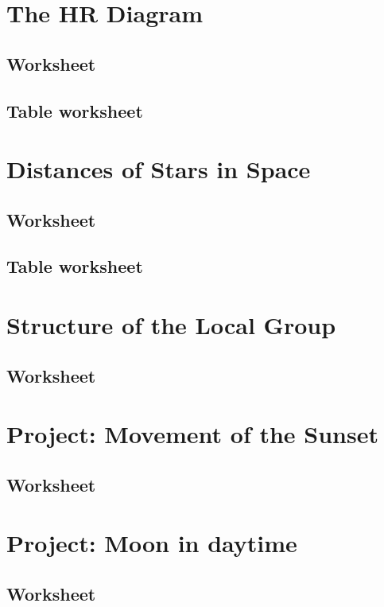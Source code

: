 \documentclass[12pt]{article}
\begin{document}
\newpage
\section{The HR Diagram}\label{apx:lab_09}
\subsection{Worksheet}\label{apx:lab_09_ws}


\newpage
\subsection{Table worksheet}\label{apx:lab_09_tb}
%

\newpage
\section{Distances of Stars in Space}\label{apx:lab_10}
\subsection{Worksheet}\label{apx:lab_10_ws}


\newpage
\subsection{Table worksheet}\label{apx:lab_10_tb}
%

\newpage
\section{Structure of the Local Group}\label{apx:lab_11}
\subsection{Worksheet}\label{apx:lab_11_ws}


\newpage
\section{Project: Movement of the Sunset}\label{apx:pro_1}
\subsection{Worksheet}\label{apx:pro_1_ws}
%

\newpage
\section{Project: Moon in daytime}\label{apx:pro_2}
\subsection{Worksheet}\label{apx:pro_2_ws}
%
\end{document}
